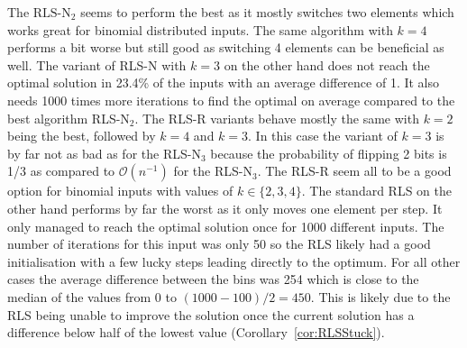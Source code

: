 The $\text{RLS-N}_2$ seems to perform the best as it mostly switches two elements which works great for binomial distributed inputs. 
The same algorithm with $k=4$ performs a bit worse but still good as switching 4 elements can be beneficial as well.
The variant of RLS-N with $k=3$ on the other hand does not reach the optimal solution in 23.4\% of the inputs with an average difference of 1.
It also needs 1000 times more iterations to find the optimal on average compared to the best algorithm RLS-N$_2$.
The RLS-R variants behave mostly the same with $k=2$ being the best, followed by $k=4$ and $k=3$.
In this case the variant of $k=3$ is by far not as bad as for the RLS-N$_3$ because the probability of flipping 2 bits is 1/3 as compared to $\mathcal{O}(n^{-1})$ for the RLS-N$_3$.
The RLS-R seem all to be a good option for binomial inputs with values of $k\in\{2,3,4\}$.
The standard RLS on the other hand performs by far the worst as it only moves one element per step.
It only managed to reach the optimal solution once for 1000 different inputs.
The number of iterations for this input was only 50 so the RLS likely had a good initialisation with a few lucky steps leading directly to the optimum.
For all other cases the average difference between the bins was 254 which is close to the median of the values from 0 to $(1000-100)/2=450$.
This is likely due to the RLS being unable to improve the solution once the current solution has a difference below half of the lowest value (Corollary~\ref{cor:RLSStuck}).